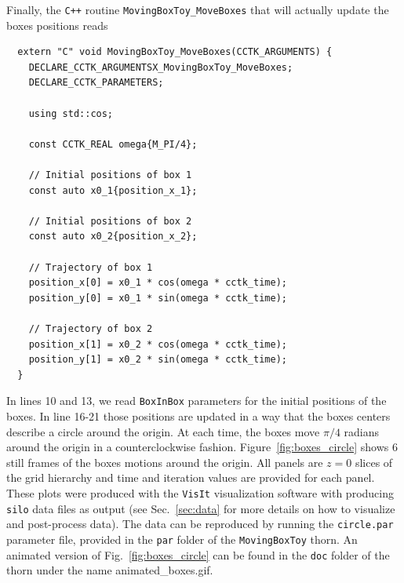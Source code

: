 Finally, the \texttt{C++} routine \texttt{MovingBoxToy\_MoveBoxes} that will actually update the boxes positions reads
%
\begin{lstlisting}
  extern "C" void MovingBoxToy_MoveBoxes(CCTK_ARGUMENTS) {
    DECLARE_CCTK_ARGUMENTSX_MovingBoxToy_MoveBoxes;
    DECLARE_CCTK_PARAMETERS;

    using std::cos;

    const CCTK_REAL omega{M_PI/4};

    // Initial positions of box 1
    const auto x0_1{position_x_1};

    // Initial positions of box 2
    const auto x0_2{position_x_2};

    // Trajectory of box 1
    position_x[0] = x0_1 * cos(omega * cctk_time);
    position_y[0] = x0_1 * sin(omega * cctk_time);

    // Trajectory of box 2
    position_x[1] = x0_2 * cos(omega * cctk_time);
    position_y[1] = x0_2 * sin(omega * cctk_time);
  }
\end{lstlisting}

In lines 10 and 13, we read \texttt{BoxInBox} parameters for the initial positions of the boxes. In line 16-21 those positions are updated in a way that the boxes centers describe a circle around the origin. At each time, the boxes move $\pi/4$ radians around the origin in a counterclockwise fashion. Figure~\ref{fig:boxes_circle} shows 6 still frames of the boxes motions around the origin. All panels are $z=0$ slices of the grid hierarchy and time and iteration values are provided for each panel. These plots were produced with the \texttt{VisIt} visualization software with \CarpetX\space producing \texttt{silo} data files as output (see Sec.~\ref{sec:data} for more details on how to visualize and post-process \CarpetX\space data). The data can be reproduced by running the \texttt{circle.par} parameter file, provided in the \texttt{par} folder of the \texttt{MovingBoxToy} thorn. An animated version of Fig.~\ref{fig:boxes_circle} can be found in the \texttt{doc} folder of the \CarpetX\space thorn under the name {animated\_boxes.gif}.

